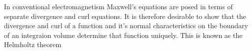 %
%
In conventional electromagnetism Maxwell's equations are posed in terms of separate divergence and curl equations.  It is therefore desirable to show that the divergence and curl of a function and it's normal characteristics on the boundary of an integraion volume determine that function uniquely.  This is known as the Helmholtz theorem

